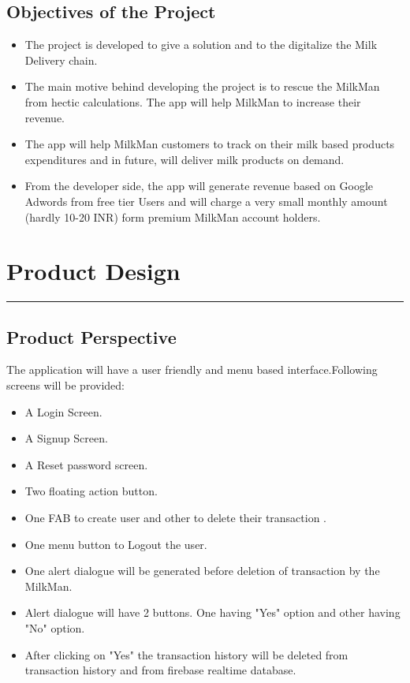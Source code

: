 \section{Objectives of the Project }
\begin{itemize}
	\item The project is developed to give a solution and to the digitalize the Milk Delivery chain.
	\item The main motive behind developing the project is to rescue the MilkMan from hectic calculations. The app will help MilkMan to increase their revenue.
	\item The app will help MilkMan customers to track on their milk based products expenditures and in future, will deliver milk products on demand.
	\item From the developer side, the app will generate revenue based on Google Adwords from free tier Users and will charge a very small monthly amount (hardly 10-20 INR) form premium MilkMan account holders.
\end{itemize}


\chapter{Product Design}\hrule
\label{Chapter:3}

\section{Product Perspective}
The application will have a user friendly and menu based interface.Following screens will be provided:
\begin{itemize}
	\item A Login Screen.
	\item A Signup Screen.
	\item A Reset password screen.
	\item Two floating action button.
	\item One FAB to create user and other to delete their transaction .
	\item One menu button to Logout the user.
	\item One alert dialogue will be generated before deletion of transaction by the MilkMan.
	\item Alert dialogue will have 2 buttons. One having "Yes" option and other having "No" option.
	\item After clicking on "Yes" the transaction history will be deleted from transaction history and from firebase realtime database.\\
\\	
	
\end{itemize}
